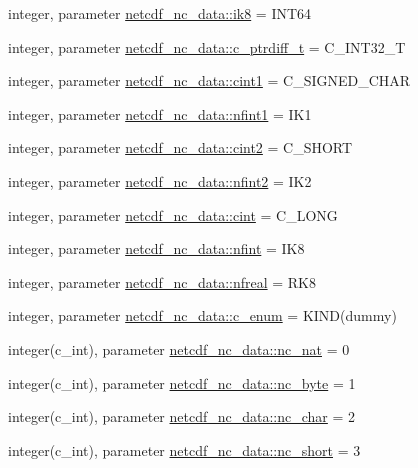 \begin{DoxyCompactItemize}
\item 
integer, parameter \hyperlink{namespacenetcdf__nc__data_aa1206c3233d0d4a8e710ae6735c91e04}{netcdf\+\_\+nc\+\_\+data\+::ik8} = I\+N\+T64
\item 
integer, parameter \hyperlink{namespacenetcdf__nc__data_a9dda9236f2034635d169f1765371dce2}{netcdf\+\_\+nc\+\_\+data\+::c\+\_\+ptrdiff\+\_\+t} = C\+\_\+\+I\+N\+T32\+\_\+T
\item 
integer, parameter \hyperlink{namespacenetcdf__nc__data_abfc4f343e83d52584cd01dc03498ffd8}{netcdf\+\_\+nc\+\_\+data\+::cint1} = C\+\_\+\+S\+I\+G\+N\+E\+D\+\_\+\+C\+H\+AR
\item 
integer, parameter \hyperlink{namespacenetcdf__nc__data_a3a80274c89dd79214673726d6d4fcb71}{netcdf\+\_\+nc\+\_\+data\+::nfint1} = I\+K1
\item 
integer, parameter \hyperlink{namespacenetcdf__nc__data_a78dd021096115a07bb600a66e8043e66}{netcdf\+\_\+nc\+\_\+data\+::cint2} = C\+\_\+\+S\+H\+O\+RT
\item 
integer, parameter \hyperlink{namespacenetcdf__nc__data_ade9f082f280165194fd84dbbc76d1ace}{netcdf\+\_\+nc\+\_\+data\+::nfint2} = I\+K2
\item 
integer, parameter \hyperlink{namespacenetcdf__nc__data_aec392a25dd2a0cd8c1170fc7623ec503}{netcdf\+\_\+nc\+\_\+data\+::cint} = C\+\_\+\+L\+O\+NG
\item 
integer, parameter \hyperlink{namespacenetcdf__nc__data_a32e1eadaff45631ba5d0930d2112f3dd}{netcdf\+\_\+nc\+\_\+data\+::nfint} = I\+K8
\item 
integer, parameter \hyperlink{namespacenetcdf__nc__data_a38828b33e056b8b908849cb7db2528c0}{netcdf\+\_\+nc\+\_\+data\+::nfreal} = R\+K8
\item 
integer, parameter \hyperlink{namespacenetcdf__nc__data_ad81dcac084fe7c7112c958b310d9d408}{netcdf\+\_\+nc\+\_\+data\+::c\+\_\+enum} = K\+I\+ND(dummy)
\item 
integer(c\+\_\+int), parameter \hyperlink{namespacenetcdf__nc__data_ae7aadc2122b946f9bc93bc14f134f111}{netcdf\+\_\+nc\+\_\+data\+::nc\+\_\+nat} = 0
\item 
integer(c\+\_\+int), parameter \hyperlink{namespacenetcdf__nc__data_a17953f2b51e4acea33c2df068cba45c6}{netcdf\+\_\+nc\+\_\+data\+::nc\+\_\+byte} = 1
\item 
integer(c\+\_\+int), parameter \hyperlink{namespacenetcdf__nc__data_a36ff919052313a4a3bd95596c4795a84}{netcdf\+\_\+nc\+\_\+data\+::nc\+\_\+char} = 2
\item 
integer(c\+\_\+int), parameter \hyperlink{namespacenetcdf__nc__data_a432fdf219e0ef17a34c2598005514bb4}{netcdf\+\_\+nc\+\_\+data\+::nc\+\_\+short} = 3

\end{DoxyCompactItemize}
